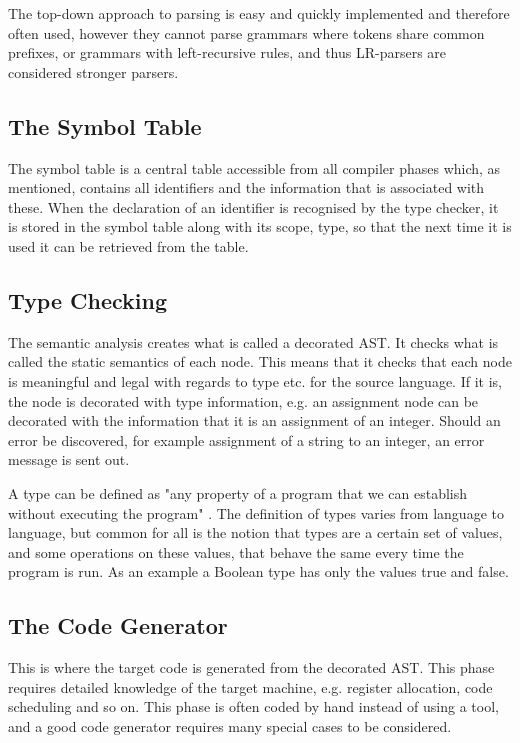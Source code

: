 The top-down approach to parsing is easy and quickly implemented and therefore often used, however they cannot parse grammars where tokens share common prefixes, or grammars with left-recursive rules, and thus LR-parsers are considered stronger parsers.

\subsection{The Symbol Table}

The symbol table is a central table accessible from all compiler phases which, as mentioned, contains all identifiers and the information that is associated with these. When the declaration of an identifier is recognised by the type checker, it is stored in the symbol table along with its scope, type, so that the next time it is used it can be retrieved from the table.

\subsection{Type Checking}
The semantic analysis creates what is called a decorated AST. It checks what is called the static semantics of each node. This means that it checks that each node is meaningful and legal with regards to type etc. for the source language. If it is, the node is decorated with type information, e.g. an assignment node can be decorated with the information that it is an assignment of an integer. Should an error be discovered, for example assignment of a string to an integer, an error message is sent out. 

A type can be defined as "any property of a program that we can establish without executing the program" \cite{Krishnamurthi2007}. The definition of types varies from language to language, but common for all is the notion that types are a certain set of values, and some operations on these values, that behave the same every time the program is run. As an example a Boolean type has only the values true and false. 

\subsection{The Code Generator}
This is where the target code is generated from the decorated AST. This phase requires detailed knowledge of the target machine, e.g. register allocation, code scheduling and so on. This phase is often coded by hand instead of using a tool, and a good code generator requires many special cases to be considered.

